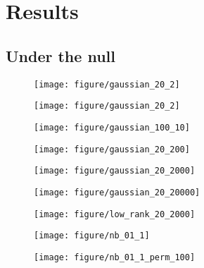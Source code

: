 \documentclass{article}
\begin{document}
\section{Results}

\subsection{Under the null}

\begin{figure}[ht]
  \centering
  \texttt{[image: figure/gaussian\_20\_2]}
  \caption{\label{fig:label} }
\end{figure}

\begin{figure}[ht]
  \centering
  \texttt{[image: figure/gaussian\_20\_2]}
  \caption{\label{fig:label} }
\end{figure}

\begin{figure}[ht]
  \centering
  \texttt{[image: figure/gaussian\_100\_10]}
  \caption{\label{fig:label} }
\end{figure}


\begin{figure}[ht]
  \centering
  \texttt{[image: figure/gaussian\_20\_200]}
  \caption{\label{fig:label} }
\end{figure}

\begin{figure}[ht]
  \centering
  \texttt{[image: figure/gaussian\_20\_2000]}
  \caption{\label{fig:label} }
\end{figure}

\begin{figure}[ht]
  \centering
  \texttt{[image: figure/gaussian\_20\_20000]}
  \caption{\label{fig:label} }
\end{figure}

\begin{figure}[ht]
  \centering
  \texttt{[image: figure/low\_rank\_20\_2000]}
  \caption{\label{fig:label} }
\end{figure}

\begin{figure}[ht]
  \centering
  \texttt{[image: figure/nb\_01\_1]}
  \caption{\label{fig:label} }
\end{figure}

\begin{figure}[ht]
  \centering
  \texttt{[image: figure/nb\_01\_1\_perm\_100]}
  \caption{\label{fig:label} }
\end{figure}
\end{document}
